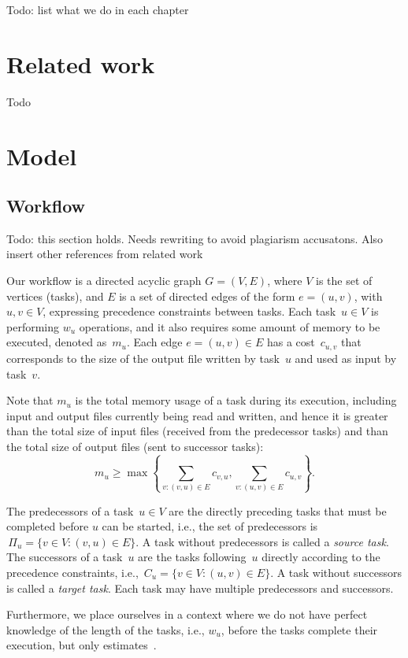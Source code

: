 \documentclass[conference]{IEEEtran}
\newcommand{\parents}[1]{\,\Pi_{#1}}
\newcommand{\children}[1]{\,C_{#1}}
\begin{document}
Todo: list what we do in each chapter


\section{Related work}
    \label{sec:related-work}

   Todo

\section{Model}
\label{sec:model}


\subsection{Workflow}
\label{sec.mod.work}

    Todo: this section holds. Needs rewriting to avoid plagiarism accusatons. Also insert other references from related work

Our workflow is a directed acyclic graph $G=(V, E)$, where $V$ is the set of vertices (tasks), and
$E$ is a set of directed edges of the form $e=(u,v)$, with \mbox{$u,v\in V$}, expressing precedence constraints between tasks.
Each task~$u \in V$  is performing $w_u$ operations, and it also
requires some amount of memory to be executed, denoted as~$m_u$.
Each edge $e=(u,v) \in E$ has a cost~$c_{u,v}$ that corresponds to the size of the output file written by task~$u$ and used as input by task~$v$.

Note that $m_u$ is the total memory usage
of a task during its execution, including input and output files currently being read and written,
and hence it is greater than the total size of input files
(received from the predecessor tasks) and than
the total size of  output files (sent to successor tasks):
$$   m_u \geq \max \left\{ \sum_{v:(v,u)\in E}c_{v,u}, \sum_{v:(u,v)\in E} c_{u,v} \right\} . $$
    

The predecessors of a task~$u\in V$ are the directly preceding tasks that must be completed before $u$ can be started, i.e., the set of predecessors is
$ \parents{u} = \{v \in V: (v,u) \in E\}$. A task without predecessors is called a {\it source task}.
The successors of a task~$u$ are the tasks following~$u$ directly according to the precedence constraints, i.e.,
$ \children{u} = \{v \in V: (u,v) \in E\}$. A task without successors is called a {\it target task}.
Each task may have multiple predecessors and successors.


Furthermore, we place ourselves in a context where we do not have perfect knowledge
of the length of the tasks, i.e., $w_u$,
before the tasks complete their execution,
but only estimates~\cite{rahman2013,GARG2015256}.  
\end{document}
